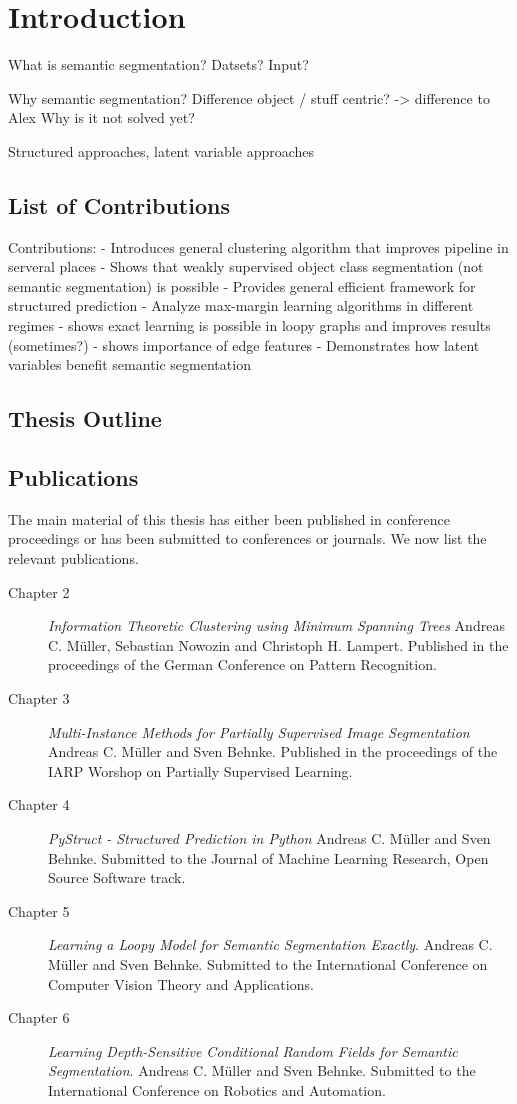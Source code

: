 \chapter{Introduction}

What is semantic segmentation?
Datsets? Input?

Why semantic segmentation? Difference object / stuff centric? -> difference to Alex
Why is it not solved yet?

Structured approaches, latent variable approaches

\section{List of Contributions}
Contributions:
- Introduces general clustering algorithm that improves pipeline in serveral places
- Shows that weakly supervised object class segmentation (not semantic segmentation) is possible
- Provides general efficient framework for structured prediction
- Analyze max-margin learning algorithms in different regimes
- shows exact learning is possible in loopy graphs and improves results (sometimes?)
- shows importance of edge features
- Demonstrates how latent variables benefit semantic segmentation

\section{Thesis Outline}


\section{Publications}
The main material of this thesis has either been published in conference proceedings or has been
submitted to conferences or journals. We now list the relevant publications.
\begin{description}
    \item[Chapter 2] \emph{Information Theoretic Clustering using Minimum Spanning Trees} Andreas C. M\"uller, Sebastian Nowozin and Christoph H. Lampert. Published in the proceedings of the German Conference on Pattern Recognition.
    \item[Chapter 3] \emph{Multi-Instance Methods for Partially Supervised Image Segmentation} Andreas C. M\"uller and Sven Behnke. Published in the proceedings of the IARP Worshop on Partially Supervised Learning.
    \item[Chapter 4] \emph{PyStruct - Structured Prediction in Python} Andreas C. M\"uller and Sven Behnke. Submitted to the Journal of Machine Learning Research, Open Source Software track.
    \item[Chapter 5] \emph{Learning a Loopy Model for Semantic Segmentation Exactly}. Andreas C. M\"uller and Sven Behnke. Submitted to the International Conference on Computer Vision Theory and Applications.
    \item[Chapter 6] \emph{Learning Depth-Sensitive Conditional Random Fields for Semantic Segmentation}. Andreas C. M\"uller and Sven Behnke. Submitted to the International Conference on Robotics and Automation.
\end{description}

